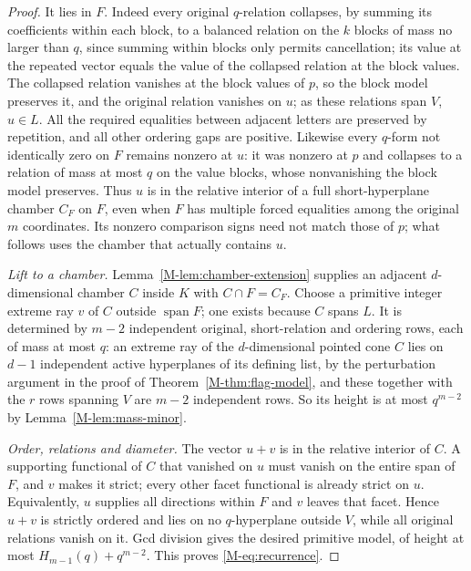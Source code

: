 \documentclass[11pt,reqno]{amsart}
\theoremstyle{plain}
\theoremstyle{definition}
\theoremstyle{plain}
\newcommand{\spn}{\operatorname{span}}
\theoremstyle{plain}
\theoremstyle{plain}
\theoremstyle{plain}
\theoremstyle{plain}
\theoremstyle{plain}
\theoremstyle{definition}
\theoremstyle{definition}
\theoremstyle{definition}
\theoremstyle{plain}
\begin{document}
\begin{proof}
It lies in $F$. Indeed every original $q$-relation collapses, by summing its
coefficients within each block, to a balanced relation on the $k$ blocks of
mass no larger than $q$, since summing within blocks only permits
cancellation; its value at the repeated vector equals the value of the
collapsed relation at the block values. The collapsed relation vanishes at
the block values of $p$, so the block model preserves it, and the original
relation vanishes on $u$; as these relations span $V$, $u\in L$. All the
required equalities between adjacent letters are preserved by repetition, and
all other ordering gaps are positive. Likewise every $q$-form not identically
zero on $F$ remains nonzero at $u$: it was nonzero at $p$ and collapses to a
relation of mass at most $q$ on the value blocks, whose nonvanishing the
block model preserves. Thus $u$ is in the relative interior of a full
short-hyperplane chamber $C_F$ on $F$, even when $F$ has multiple forced
equalities among the original $m$ coordinates. Its nonzero comparison signs
need not match those of $p$; what follows uses the chamber that actually
contains $u$.

\smallskip\noindent\emph{Lift to a chamber.}
Lemma~\ref{M-lem:chamber-extension} supplies an adjacent $d$-dimensional
chamber $C$ inside $K$ with $C\cap F=C_F$. Choose a primitive integer extreme
ray $v$ of $C$ outside $\spn F$; one exists because $C$ spans $L$. It is
determined by $m-2$ independent original, short-relation and ordering rows,
each of mass at most $q$: an extreme ray of the $d$-dimensional pointed
cone $C$ lies on $d-1$ independent active hyperplanes of its defining list,
by the perturbation argument in the proof of Theorem~\ref{M-thm:flag-model},
and these together with the $r$ rows spanning $V$ are $m-2$ independent
rows. So its height is at most $q^{m-2}$ by Lemma~\ref{M-lem:mass-minor}.

\smallskip\noindent\emph{Order, relations and diameter.}
The vector $u+v$ is in the relative interior of $C$. A supporting functional
of $C$ that vanished on $u$ must vanish on the entire span of $F$, and $v$
makes it strict; every other facet functional is already strict on $u$.
Equivalently, $u$ supplies all directions within $F$ and $v$ leaves that
facet. Hence $u+v$ is strictly ordered and lies on no $q$-hyperplane outside
$V$, while all original relations vanish on it. Gcd division gives the
desired primitive model, of height at most $H_{m-1}(q)+q^{m-2}$. This proves
\eqref{M-eq:recurrence}.
\end{proof}
\end{document}
